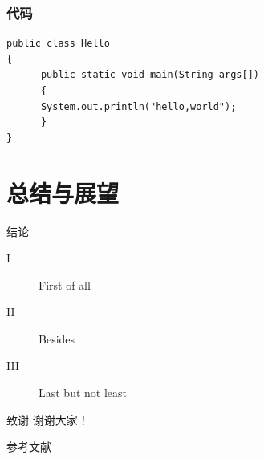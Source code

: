 \documentclass[hyperref,UTF8,10pt]{beamer}
\numberwithin{equation}{section} %
\begin{document}
\begin{frame}[fragile]
\frametitle{代码}
\begin{verbatim}
public class Hello
{
      public static void main(String args[])
      {
      System.out.println("hello,world");
      }
}
\end{verbatim}
\end{frame}

\section{总结与展望}

\begin{frame}{结论}
    \begin{description}
        \item[I] First of all
        \item[II] Besides
        \item[III] Last but not least
    \end{description}
\end{frame}

\begin{frame}{致谢}
 \centering
 \Huge 谢谢大家！
\end{frame}

\begin{frame}{参考文献}


\end{frame}
\end{document}
